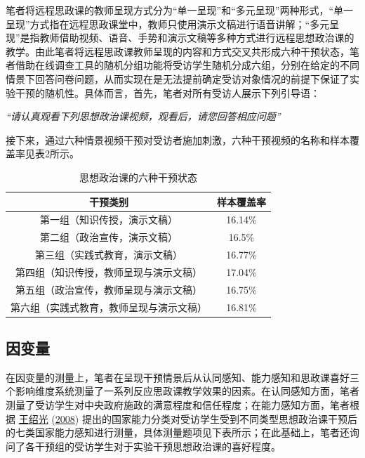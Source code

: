 \documentclass[
  12pt,
]{ctexart}
\begin{document}
笔者将远程思政课的教师呈现方式分为``单一呈现''和``多元呈现''两种形式，``单一呈现''方式指在远程思政课堂中，教师只使用演示文稿进行语音讲解；``多元呈现''是指教师借助视频、语音、手势和演示文稿等多种方式进行远程思想政治课的教学。由此笔者将远程思政课教师呈现的内容和方式交叉共形成六种干预状态，笔者借助在线调查工具的随机分组功能将受访学生随机分成六组，分别在给定的不同情景下回答问卷问题，从而实现在是无法提前确定受访对象情况的前提下保证了实验干预的随机性。具体而言，首先，笔者对所有受访人展示下列引导语：

\emph{``请认真观看下列思想政治课视频，观看后，请您回答相应问题''}

接下来，通过六种情景视频干预对受访者施加刺激，六种干预视频的名称和样本覆盖率见表2所示。

\begin{table}[!h]

\caption{\label{tab:unnamed-chunk-4}思想政治课的六种干预状态}
\centering
\begin{tabular}[t]{cc}
\toprule
干预类别 & 样本覆盖率\\
\midrule
第一组（知识传授，演示文稿） & 16.14\%\\
第二组（政治宣传，演示文稿） & 16.5\%\\
第三组（实践式教育，演示文稿） & 16.77\%\\
第四组（知识传授，教师呈现与演示文稿） & 17.04\%\\
第五组（政治宣传，教师呈现与演示文稿） & 16.75\%\\
\addlinespace
第六组（实践式教育，教师呈现与演示文稿） & 16.81\%\\
\bottomrule
\end{tabular}
\end{table}

\hypertarget{ux56e0ux53d8ux91cf}{%
\subsection{因变量}\label{ux56e0ux53d8ux91cf}}

在因变量的测量上，笔者在呈现干预情景后从认同感知、能力感知和思政课喜好三个影响维度系统测量了一系列反应思政课教学效果的因素。在认同感知方面，笔者测量了受访学生对中央政府施政的满意程度和信任程度；在能力感知方面，笔者根据 \protect\hyperlink{ref-WangShaoGuang2008}{王绍光} (\protect\hyperlink{ref-WangShaoGuang2008}{2008}) 提出的国家能力分类对受访学生受到不同类型思想政治课干预后的七类国家能力感知进行测量，具体测量题项见下表所示；在此基础上，笔者还询问了各干预组的受访学生对于实验干预思想政治课的喜好程度。
\end{document}
